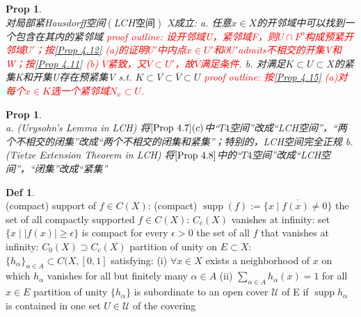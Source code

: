 \documentclass[hidelinks]{article}
\theoremstyle{definition}
\newtheorem*{defin}{Def}
\theoremstyle{plain}
\newtheorem{proposition}[theorem]{Prop}
\theoremstyle{remark}
\DeclareMathOperator\supp{supp}
\begin{document}
\begin{proposition}\label{Prop 4.15}~\\
对局部紧Hausdorff空间$(LCH\textrm{空间})$ X成立:\newline
a. 任意$x\in X$的开邻域中可以找到一个包含在其内的紧邻域 \newline
\textcolor{red}{proof outline: 设开邻域U，紧邻域F，则$U\cap F^o$构成预紧开邻域$U'$；按\autoref{Prop 4.12} (a)的证明$U'$中内点$x\in U'$和$\partial U'$admits不相交的开集V和W；按\autoref{Prop 4.11} (b) $\overline{V}$紧致，又$\overline{V}\subset U'$，故$\overline{V}$满足条件.} \newline
b. 对满足$K\subset U\subset X$的紧集K和开集U存在预紧集V s.t. $K\subset V\subset \overline{V} \subset U$ \newline
\textcolor{red}{proof outline: 按\autoref{Prop 4.15} (a)对每个$x\in K$选一个紧邻域$N_x\subset U$.}
\end{proposition}

\begin{proposition}~\\
a. (Urysohn's Lemma in LCH) 将$\autoref{Prop 4.7} (c)$中“$T4$空间”改成“LCH空间”，“两个不相交的闭集”改成“两个不相交的闭集和紧集”；特别的，LCH空间完全正规\newline
b. (Tietze Extension Theorem in LCH) 将$\autoref{Prop 4.8}$中的“$T4$空间”改成“LCH空间”，“闭集”改成“紧集”
\end{proposition}

\begin{defin}~\\
(compact) support of $f\in C(X)$: (compact) $\supp(f):=\overline{\{x\mid f(x)\neq 0\}}$ \newline
\indent the set of all compactly supported $f\in C(X)$: $C_c(X)$ \newline
vanishes at infinity: set $\{x\mid |f(x)|\geq \epsilon \}$ is compact for every $\epsilon >0$\newline
\indent the set of all $f$ that vanishes at infinity: $C_0(X)\supset C_c(X)$\newline
partition of unity on $E\subset X$: $\{h_\alpha\}_{\alpha \in A}\subset C(X,[0,1]$ satisfying:\newline
\indent (i) $\forall x\in X$ exists a neighborhood of $x$ on which $h_\alpha$ vanishes for all but finitely many $\alpha \in A$ \newline
\indent (ii) $\sum_{\alpha \in A}h_\alpha(x)=1$ for all $x\in E$ \newline
partition of unity $\{h_\alpha\}$ is subordinate to an open cover $\mathscr{U}$ of E if $\supp{h_\alpha}$ is contained in one set $U\in \mathscr{U}$ of the covering
\end{defin}
\end{document}
